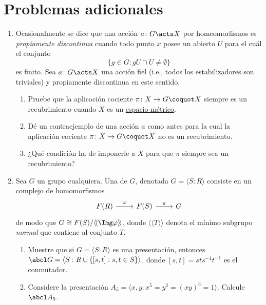 \documentclass[11pt, reqno]{amsart}
\begin{document}
\section{Problemas adicionales}
\begin{enumerate}[resume]
	\item Ocasionalmente se dice que una acción $a \colon G \acts X$ por homeomorfismos es \emph{propiamente discontinua} cuando todo
		punto $x$ posee un abierto $U$ para el cuál el conjunto
		\[
			\{ g \in G : gU \cap U \ne \emptyset \}
		\]
		es finito.
		Sea $a \colon G \acts X$ una acción fiel (i.e., todos los estabilizadores son triviales) y propiamente discontinua en este
		sentido.
		\begin{enumerate}
			\item Pruebe que la aplicación cociente $\pi \colon X \to G\coquot X$ siempre es un recubrimiento cuando
				$X$ es un \underline{espacio métrico}.
			\item Dé un contraejemplo de una acción $a$ como antes para la cual la aplicación cociente $\pi \colon X \to
				G\coquot X$ no es un recubrimiento.
			\item ¿Qué condición ha de imponerle a $X$ para que $\pi$ siempre sea un recubrimiento?
				\textcolor{white}{Resp.: $T_3$.}
		\end{enumerate}

	\item Sea $G$ un grupo cualquiera.
		Una  de $G$, denotada $G = \langle S : R \rangle$ consiste en un complejo de homomorfismos
		\[\begin{tikzcd}
			F(R) \rar["\varphi"] & F(S) \rar["\pi"] & G
		\end{tikzcd}\]
		de modo que $G \cong F(S)/\langle\!\langle \Img \varphi \rangle\!\rangle$, donde $\langle\!\langle T \rangle\!\rangle$
		denota el mínimo subgrupo \emph{normal} que contiene al conjunto $T$.
		\begin{enumerate}
			\item Muestre que si $G = \langle S : R \rangle$ es una presentación, entonces $\abcl G = \langle S : R \cup \{ [s,
				t] : s, t \in S \} \rangle$, donde $[s, t] = sts^{-1}t^{-1}$ es el conmutador.
			\item Considere\footnotemark{} la presentación $A_5 = \langle x, y : x^5 = y^2 = (xy)^3 = 1 \rangle$.
				Calcule $\abcl A_5$.
		\end{enumerate}
\end{enumerate}

\printbibliography
\end{document}
